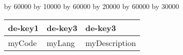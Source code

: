 
\begin{table}[htb]
\centering

\ifthenelse{\isundefined{\tabLenA}}{\newlength{\tabLenA}}{}
\ifthenelse{\isundefined{\tabLenB}}{\newlength{\tabLenB}}{}
\ifthenelse{\isundefined{\tabLenC}}{\newlength{\tabLenC}}{}

\setlength{\tabLenA}{\textwidth}
\setlength{\tabLenB}{\textwidth}
\setlength{\tabLenC}{\textwidth}

\divide\tabLenA by 60000
\multiply\tabLenA by 10000
\divide\tabLenB by 60000
\multiply\tabLenB by 20000
\divide\tabLenC by 60000
\multiply\tabLenC by 30000
\begin{tabular}{|p{\tabLenA}|p{\tabLenB}|p{\tabLenC}|}
\hline

de-key1
&

de-key3
&

de-key3
\\
\hline
\hline

myCode
&

myLang
&

myDescription
\\
\hline
\end{tabular}
\end{table}
